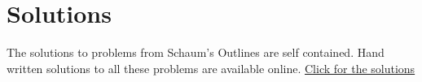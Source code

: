 \section{Solutions}
The solutions to problems from Schaum's Outlines are self contained.  Hand written solutions to all these problems are available online.  \href{https://ilearn.byui.edu/bbcswebdav/institution/Physical\_Sci\_Eng/Mathematics/Personal\%20Folders/WoodruffB/316/01-Review-Preparation-Solutions.pdf}{Click for the solutions}

